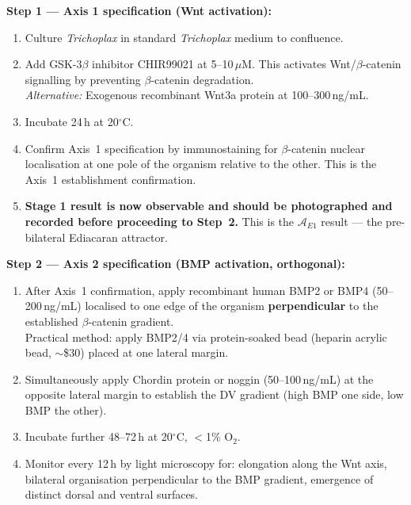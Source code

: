 \documentclass[12pt, a4paper]{article}
\theoremstyle{definition}
\theoremstyle{remark}
\begin{document}
\vspace{0.5em}
\textbf{Step 1 --- Axis 1 specification (Wnt activation):}

\begin{enumerate}[label=\arabic*.]
  \item Culture \textit{Trichoplax} in standard
        \textit{Trichoplax} medium to confluence.
  \item Add GSK-3$\beta$ inhibitor CHIR99021 at
        5--10\,$\mu$M. This activates
        Wnt/$\beta$-catenin signalling by preventing
        $\beta$-catenin degradation.\\
        \textit{Alternative:} Exogenous recombinant
        Wnt3a protein at 100--300\,ng/mL.
  \item Incubate 24\,h at 20$^\circ$C.
  \item Confirm Axis~1 specification by immunostaining
        for $\beta$-catenin nuclear localisation at
        one pole of the organism relative to the
        other. This is the Axis~1 establishment
        confirmation.
  \item \textbf{Stage 1 result is now observable and
        should be photographed and recorded before
        proceeding to Step~2.} This is the
        $\mathcal{A}_{E1}$ result --- the pre-bilateral
        Ediacaran attractor.
\end{enumerate}

\vspace{0.5em}
\textbf{Step 2 --- Axis 2 specification (BMP activation,
orthogonal):}

\begin{enumerate}[label=\arabic*.]
  \item After Axis~1 confirmation, apply
        recombinant human BMP2 or BMP4
        (50--200\,ng/mL) localised to one edge of the
        organism \textbf{perpendicular} to the
        established $\beta$-catenin gradient.\\
        Practical method: apply BMP2/4 via
        protein-soaked bead (heparin acrylic bead,
        $\sim$\$30) placed at one lateral margin.
  \item Simultaneously apply Chordin protein or
        noggin (50--100\,ng/mL) at the opposite
        lateral margin to establish the DV gradient
        (high BMP one side, low BMP the other).
  \item Incubate further 48--72\,h at 20$^\circ$C,
        $<$1\% O$_2$.
  \item Monitor every 12\,h by light microscopy for:
        elongation along the Wnt axis, bilateral
        organisation perpendicular to the BMP
        gradient, emergence of distinct dorsal and
        ventral surfaces.
\end{enumerate}
\end{document}
